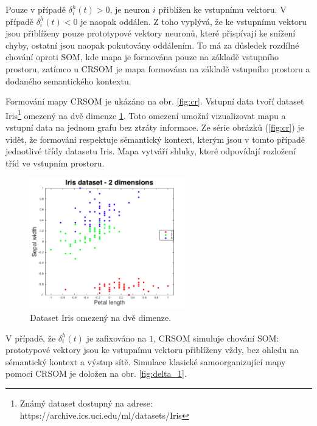 \documentclass[thesis=M,czech]{FITthesis}[2012/06/26]
\begin{document}
Pouze v případě $ \delta_i^h(t) > 0 $, je neuron $i$ přiblížen ke vstupnímu vektoru. V případě $ \delta_i^h(t) < 0 $ je naopak oddálen. Z toho vyplývá, že ke vstupnímu vektoru jsou přiblíženy pouze prototypové vektory neuronů, které přispívají ke snížení chyby, ostatní jsou naopak pokutovány oddálením. To má za důsledek rozdílné chování oproti SOM, kde mapa je formována pouze na základě vstupního prostoru, zatímco u CRSOM je mapa formována na základě vstupního prostoru a dodaného semantického kontextu. 

Formování mapy CRSOM je ukázáno na obr. \ref{fig:cr}. Vstupní data tvoří dataset Iris\footnote{Známý dataset dostupný na adrese: https://archive.ics.uci.edu/ml/datasets/Iris} omezený na dvě dimenze \ref{fig:iris2d}. Toto omezení umožní vizualizovat mapu a vstupní data na jednom grafu bez ztráty informace. Ze série obrázků (\ref{fig:cr}) je vidět, že formování respektuje sémantický kontext, kterým jsou v tomto případě jednotlivé třídy datasetu Iris. Mapa vytváří shluky, které odpovídají rozložení tříd ve vstupním prostoru.




\begin{figure}[htp]    
    \centering
    \includegraphics[width=0.6\textwidth]{feature_space_with_classes.png}
    \caption{Dataset Iris omezený na dvě dimenze.}
    \label{fig:iris2d}
\end{figure}


V případě, že $ \delta_i^h(t)$ je zafixováno na $1$, CRSOM simuluje chování SOM: prototypové vektory jsou ke vstupnímu vektoru přiblíženy vždy, bez ohledu na sémantický kontext a výstup sítě. Simulace klasické samoorganizující mapy pomocí CRSOM je doložen na obr. \ref{fig:delta_1}.
\end{document}

